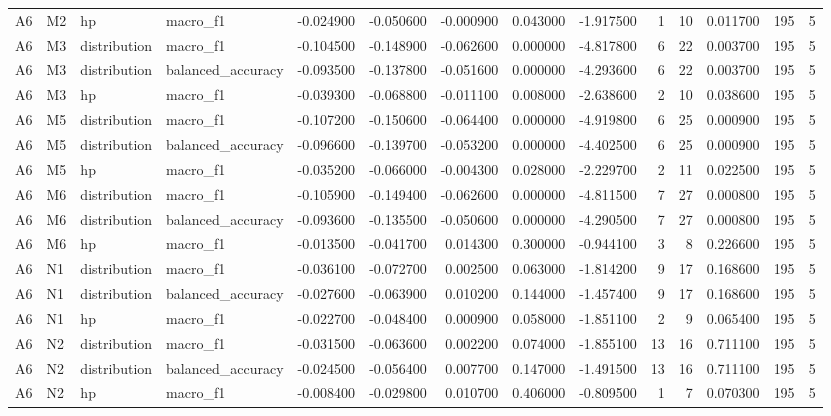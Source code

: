\begin{table}
\begin{tabular}{llllrrrrrrrrrr}
A6 & M2 & hp & macro\_f1 & -0.024900 & -0.050600 & -0.000900 & 0.043000 & -1.917500 & 1 & 10 & 0.011700 & 195 & 5 \\
A6 & M3 & distribution & macro\_f1 & -0.104500 & -0.148900 & -0.062600 & 0.000000 & -4.817800 & 6 & 22 & 0.003700 & 195 & 5 \\
A6 & M3 & distribution & balanced\_accuracy & -0.093500 & -0.137800 & -0.051600 & 0.000000 & -4.293600 & 6 & 22 & 0.003700 & 195 & 5 \\
A6 & M3 & hp & macro\_f1 & -0.039300 & -0.068800 & -0.011100 & 0.008000 & -2.638600 & 2 & 10 & 0.038600 & 195 & 5 \\
A6 & M5 & distribution & macro\_f1 & -0.107200 & -0.150600 & -0.064400 & 0.000000 & -4.919800 & 6 & 25 & 0.000900 & 195 & 5 \\
A6 & M5 & distribution & balanced\_accuracy & -0.096600 & -0.139700 & -0.053200 & 0.000000 & -4.402500 & 6 & 25 & 0.000900 & 195 & 5 \\
A6 & M5 & hp & macro\_f1 & -0.035200 & -0.066000 & -0.004300 & 0.028000 & -2.229700 & 2 & 11 & 0.022500 & 195 & 5 \\
A6 & M6 & distribution & macro\_f1 & -0.105900 & -0.149400 & -0.062600 & 0.000000 & -4.811500 & 7 & 27 & 0.000800 & 195 & 5 \\
A6 & M6 & distribution & balanced\_accuracy & -0.093600 & -0.135500 & -0.050600 & 0.000000 & -4.290500 & 7 & 27 & 0.000800 & 195 & 5 \\
A6 & M6 & hp & macro\_f1 & -0.013500 & -0.041700 & 0.014300 & 0.300000 & -0.944100 & 3 & 8 & 0.226600 & 195 & 5 \\
A6 & N1 & distribution & macro\_f1 & -0.036100 & -0.072700 & 0.002500 & 0.063000 & -1.814200 & 9 & 17 & 0.168600 & 195 & 5 \\
A6 & N1 & distribution & balanced\_accuracy & -0.027600 & -0.063900 & 0.010200 & 0.144000 & -1.457400 & 9 & 17 & 0.168600 & 195 & 5 \\
A6 & N1 & hp & macro\_f1 & -0.022700 & -0.048400 & 0.000900 & 0.058000 & -1.851100 & 2 & 9 & 0.065400 & 195 & 5 \\
A6 & N2 & distribution & macro\_f1 & -0.031500 & -0.063600 & 0.002200 & 0.074000 & -1.855100 & 13 & 16 & 0.711100 & 195 & 5 \\
A6 & N2 & distribution & balanced\_accuracy & -0.024500 & -0.056400 & 0.007700 & 0.147000 & -1.491500 & 13 & 16 & 0.711100 & 195 & 5 \\
A6 & N2 & hp & macro\_f1 & -0.008400 & -0.029800 & 0.010700 & 0.406000 & -0.809500 & 1 & 7 & 0.070300 & 195 & 5 \\

\end{tabular}
\end{table}
